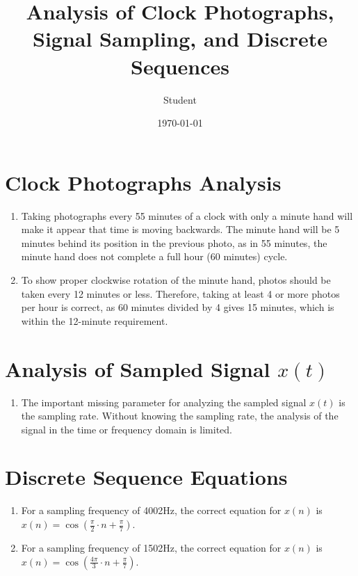 \documentclass{article}
\begin{document}
\title{Analysis of Clock Photographs, Signal Sampling, and Discrete Sequences}
\author{Student}
\date{\today}
\maketitle

\section*{Clock Photographs Analysis}

\begin{enumerate}
    \item Taking photographs every 55 minutes of a clock with only a minute hand will make it appear that time is moving backwards. The minute hand will be 5 minutes behind its position in the previous photo, as in 55 minutes, the minute hand does not complete a full hour (60 minutes) cycle.
    \item To show proper clockwise rotation of the minute hand, photos should be taken every 12 minutes or less. Therefore, taking at least 4 or more photos per hour is correct, as 60 minutes divided by 4 gives 15 minutes, which is within the 12-minute requirement.
\end{enumerate}

\section*{Analysis of Sampled Signal \( x(t) \)}

\begin{enumerate}
    \item The important missing parameter for analyzing the sampled signal \( x(t) \) is the sampling rate. Without knowing the sampling rate, the analysis of the signal in the time or frequency domain is limited.
\end{enumerate}

\section*{Discrete Sequence Equations}

\begin{enumerate}
    \item For a sampling frequency of 4002Hz, the correct equation for \( x(n) \) is \( x(n) = \cos\left(\frac{\pi}{2} \cdot n + \frac{\pi}{7}\right) \).
    \item For a sampling frequency of 1502Hz, the correct equation for \( x(n) \) is \( x(n) = \cos\left(\frac{4\pi}{3} \cdot n + \frac{\pi}{7}\right) \).
\end{enumerate}
\end{document}
